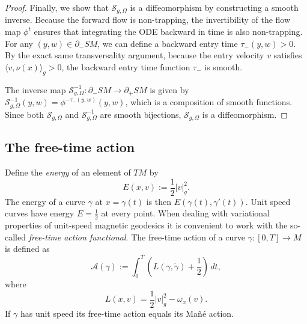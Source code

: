 \documentclass[12pt]{amsart}
\numberwithin{equation}{section}
\begin{document}
\begin{proof}
Finally, we show that $\mathcal{S}_{g,\Omega}$ is a diffeomorphism by constructing a smooth inverse. Because the forward flow is non-trapping, the invertibility of the flow map $\phi^t$ ensures that integrating the ODE backward in time is also non-trapping. For any $(y,w) \in \partial_- SM$, we can define a backward entry time $\tau_-(y,w) > 0$. By the exact same transversality argument, because the entry velocity $v$ satisfies $\langle v, \nu(x) \rangle_g > 0$, the backward entry time function $\tau_-$ is smooth.

The inverse map $\mathcal{S}_{g,\Omega}^{-1}: \partial_- SM \to \partial_+ SM$ is given by $\mathcal{S}_{g,\Omega}^{-1}(y,w) = \phi^{-\tau_-(y,w)}(y,w)$, which is a composition of smooth functions. Since both $\mathcal{S}_{g,\Omega}$ and $\mathcal{S}_{g,\Omega}^{-1}$ are smooth bijections, $\mathcal{S}_{g,\Omega}$ is a diffeomorphism.
\end{proof}

\subsection{The free-time action}\label{section4.4}
Define the \emph{energy} of an element of $TM$ by
\begin{equation}
E(x,v):=\frac{1}{2}|v|_{g}^{2}.
\end{equation}
The energy of a curve $\gamma$ at $x=\gamma(t)$ is then $E(\gamma(t),\gamma'(t))$. Unit speed curves have energy $E=\frac12$ at every point. When dealing with variational properties of unit-speed magnetic geodesics it is convenient to work with the so-called {\it free-time action functional}.
The free-time action of a curve $\gamma:[0,T]\to M$ is defined as
\begin{equation}
{\mathcal A}(\gamma):=\int_{0}^{T}\left (L(\gamma,\dot{\gamma})+\frac{1}{2}\right)\,dt,
\end{equation}
where
\begin{equation}
L(x,v)= \frac{1}{2}|v|_g^2 - \omega_x(v).
\end{equation}
If $\gamma$ has unit speed its free-time action equals its Ma\~n\'e action.
\end{document}
